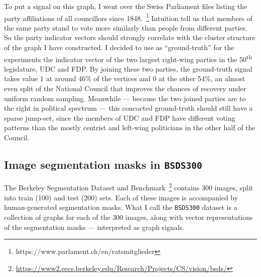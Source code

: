 To put a signal on this graph, I went over the Swiss Parliament files listing the party affiliations of all councillors since 1848.~\footnote{https://www.parlament.ch/en/ratsmitglieder} Intuition tell us that members of the same party stand to vote more similarly than people from different parties. So the party indicator vectors should strongly correlate with the cluster structure of the graph I have constructed. I decided to use as ``ground-truth'' for the experiments the indicator vector of the two largest right-wing parties in the 50\textsuperscript{th} legislature, UDC and FDP. By joining these two parties, the ground-truth signal takes value $1$ at around 46\% of the vertices and $0$ at the other 54\%, an almost even split of the National Council that improves the chances of recovery under uniform random sampling. Meanwhile --- because the two joined parties are to the right in political spectrum --- this concocted ground-truth should still have a sparse jump-set, since the members of UDC and FDP have different voting patterns than the mostly centrist and left-wing politicians in the other half of the Council.

\subsection{Image segmentation masks in \texttt{BSDS300}}

The Berkeley Segmentation Dataset and Benchmark~\footnote{\url{https://www2.eecs.berkeley.edu/Research/Projects/CS/vision/bsds/}} contains 300 images, split into train (100)  and test (200) sets. Each of these images is accompanied by human-generated segmentation masks. What I call the \texttt{BSDS300} dataset is a collection of graphs for each of the 300 images, along with vector representations of the segmentation masks --- interpreted as graph signals.

